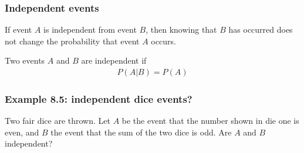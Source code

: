\begin{frame}
    \frametitle{Independent events}
    \scriptsize

    If event $A$ is independent from event $B$, then knowing that $B$ has
    occurred does not change the probability that event $A$ occurs.

    \begin{probDef}
        Two events $A$ and $B$ are independent if
        \begin{align*}
            P(A|B)=P(A)
        \end{align*}
    \end{probDef}
    


    \normalsize


\end{frame}

\begin{frame}
    \frametitle{Example 8.5: independent dice events?}

    \begin{manualProbExample}{8.5}
        Two fair dice are thrown. Let $A$ be the event that the number shown in
        die one is even, and $B$ the event that the sum of the two dice
        is odd. Are $A$ and $B$ independent?
    \end{manualProbExample}

\end{frame}

